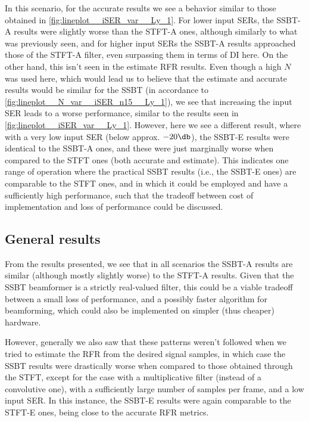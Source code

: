 In this scenario, for the accurate results we see a behavior similar to those obtained in \cref{fig:lineplot__iSER_var__Ly_1}. For lower input SERs, the SSBT-A results were slightly worse than the STFT-A ones, although similarly to what was previously seen, and for higher input SERs the SSBT-A results approached those of the STFT-A filter, even surpassing them in terms of DI here. On the other hand, this isn't seen in the estimate RFR results. Even though a high $N$ was used here, which would lead us to believe that the estimate and accurate results would be similar for the SSBT (in accordance to \cref{fig:lineplot__N_var__iSER_n15__Ly_1}), we see that increasing the input SER leads to a worse performance, similar to the results seen in \cref{fig:lineplot__iSER_var__Ly_1}. However, here we see a different result, where with a very low input SER (below approx. $-20 \dB$), the SSBT-E results were identical to the SSBT-A ones, and these were just marginally worse when compared to the STFT ones (both accurate and estimate). This indicates one range of operation where the practical SSBT results (i.e., the SSBT-E ones) are comparable to the STFT ones, and in which it could be employed and have a sufficiently high performance, such that the tradeoff between cost of implementation and loss of performance could be discussed.


\subsection{General results}

From the results presented, we see that in all scenarios the SSBT-A results are similar (although mostly slightly worse) to the STFT-A results. Given that the SSBT beamformer is a strictly real-valued filter, this could be a viable tradeoff between a small loss of performance, and a possibly faster algorithm for beamforming, which could also be implemented on simpler (thus cheaper) hardware.

However, generally we also saw that these patterns weren't followed when we tried to estimate the RFR from the desired signal samples, in which case the SSBT results were drastically worse when compared to those obtained through the STFT, except for the case with a multiplicative filter (instead of a convolutive one), with a sufficiently large number of samples per frame, and a low input SER. In this instance, the SSBT-E results were again comparable to the STFT-E ones, being close to the accurate RFR metrics.